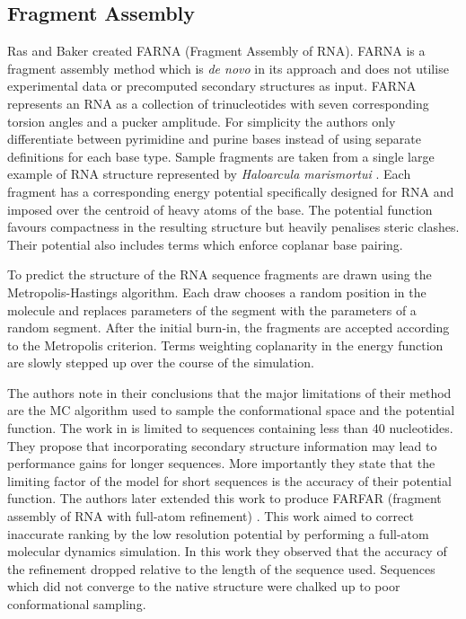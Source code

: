 \documentclass[journal]{IEEEtran}
\begin{document}
\subsection{Fragment Assembly}
\label{subsec:fragment-assembly}

Ras and Baker \cite{das2007automated} created FARNA (Fragment Assembly of RNA). FARNA is a fragment assembly method which is \textit{de novo} in its approach and does not utilise experimental data or precomputed secondary structures as input. FARNA represents an RNA as a collection of trinucleotides with seven corresponding torsion angles and a pucker amplitude. For simplicity the authors only differentiate between pyrimidine and purine bases instead of using separate definitions for each base type. Sample fragments are taken from a single large example of RNA structure represented by \textit{Haloarcula marismortui} \cite{ban2000complete}. Each fragment has a corresponding energy potential specifically designed for RNA and imposed over the centroid of heavy atoms of the base. The potential function favours compactness in the resulting structure but heavily penalises steric clashes. Their potential also includes terms which enforce coplanar base pairing. 

To predict the structure of the RNA sequence fragments are drawn using the Metropolis-Hastings algorithm. Each draw chooses a random position in the molecule and replaces parameters of the segment with the parameters of a random segment. After the initial burn-in, the fragments are accepted according to the Metropolis criterion. Terms weighting coplanarity in the energy function are slowly stepped up over the course of the simulation.

The authors note in their conclusions that the major limitations of their method are the MC algorithm used to sample the conformational space and the potential function. The work in \cite{das2007automated} is limited to sequences containing less than 40 nucleotides. They propose that incorporating secondary structure information may lead to performance gains for longer sequences. More importantly they state that the limiting factor of the model for short sequences is the accuracy of their potential function. The authors later extended this work to produce FARFAR (fragment assembly of RNA with full-atom refinement) \cite{das2010atomic}. This work aimed to correct inaccurate ranking by the low resolution potential by performing a full-atom molecular dynamics simulation. In this work they observed that the accuracy of the refinement dropped relative to the length of the sequence used. Sequences which did not converge to the native structure were chalked up to poor conformational sampling.
\end{document}
